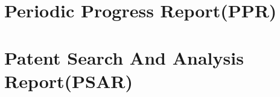 \documentclass[12pt,a4paper,final,oneside]{report}
\begin{document}
\begin{appendices}
\chapter{Periodic Progress Report(PPR)}
	 \chapter{Patent Search And Analysis Report(PSAR)}
\end{appendices}
\end{document}
